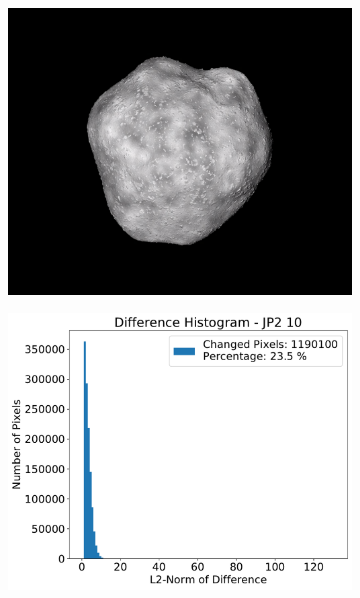 \begin{figure}[htb]
    \centering
    \begin{subfigure}[b]{0.48\textwidth}
        \centering
        \includegraphics[width=\textwidth]{doc/thesis/0_figures/compare_quality/set1/jp2_10}
        \caption{}
        \label{fig:img_quality_comp_jp2_10_orig}
    \end{subfigure}
    \begin{subfigure}[b]{0.48\textwidth}
        \centering
        \includegraphics[width=\textwidth]{doc/thesis/0_figures/compare_quality/set1/jp2_10_diff_histogram}

\end{subfigure}
\end{figure}
